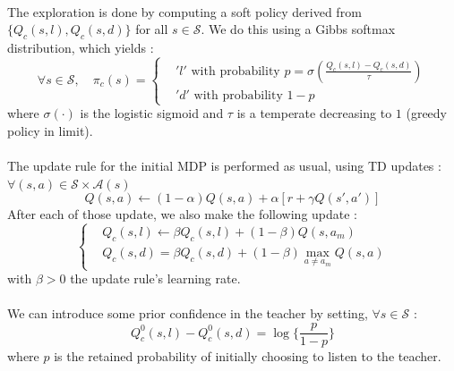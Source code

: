 \documentclass[a4paper]{report}
\begin{document}
{{{{			\paragraph{} The exploration is done by computing a soft policy derived from $\{Q_c(s,l), Q_c(s,d)\}$ for all $s\in\mathcal{S}$. We do this using a Gibbs softmax distribution, which yields : 
			\begin{equation}
				\forall s \in\mathcal{S}, \quad \pi_c(s) = 
					\left\{
						\begin{aligned}
							&'l' \text{ with probability } p=\sigma\left(\frac{Q_c(s,l) - Q_c(s,d)}{\tau} \right) \\
							& 'd'  \text{ with probability } 1-p
						\end{aligned}
					\right.
			\end{equation}
			where $\sigma(\cdot)$ is the logistic sigmoid and $\tau$ is a temperate decreasing to $1$ (greedy policy in limit). 
			
			\paragraph{} The update rule for the initial MDP is performed as usual, using TD updates : $\forall{(s,a)}\in\mathcal{S}\times\mathcal{A}(s)$
			\begin{equation}
				Q(s,a) \leftarrow (1-\alpha)Q(s,a) + \alpha \left[ r + \gamma Q(s',a')\right]
			\end{equation}
			After each of those update, we also make the following update : 
			\begin{equation}
				\label{eq::av_update_rule}
				\left\{
				\begin{aligned}
					&Q_c(s,l) \leftarrow  \beta Q_c(s,l) + (1-\beta)Q(s,a_m) \\
					&Q_c(s,d) = \beta Q_c(s,d) + (1-\beta)\max_{a\neq a_m} Q(s,a) 
				\end{aligned}
				\right.
			\end{equation}
			with $\beta >0$ the update rule's learning rate. 
			\paragraph{} We can introduce some prior confidence in the teacher by setting, $\forall s\in\mathcal{S}$ : 
			\begin{equation}
				Q^0_c(s,l) - Q^0_c(s,d) = \log\{\frac{p}{1-p}\}
			\end{equation}
			where $p$ is the retained probability of initially choosing to listen to the teacher. 
			}
		}	
	}
	
}
\end{document}
